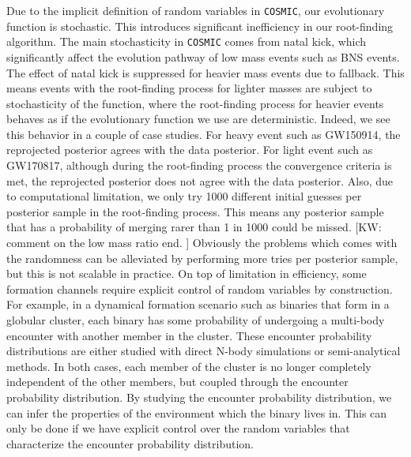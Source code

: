 \documentclass[twocolumn]{aastex631}
\newcommand{\kw}[1]{{\color{rb4}[KW: #1 ]}}
\begin{document}
Due to the implicit definition of random variables in \texttt{COSMIC}, our evolutionary function is stochastic.
This introduces significant inefficiency in our root-finding algorithm.
The main stochasticity in \texttt{COSMIC} comes from natal kick, which significantly affect the evolution pathway of low mass events such as BNS events.
The effect of natal kick is suppressed for heavier mass events due to fallback.
This means events with the root-finding process for lighter masses are subject to stochasticity of the function,
where the root-finding process for heavier events behaves as if the evolutionary function we use are deterministic.
Indeed, we see this behavior in a couple of case studies.
For heavy event such as GW150914, the reprojected posterior agrees with the data posterior.
For light event such as GW170817, although during the root-finding process the convergence criteria is met,
the reprojected posterior does not agree with the data posterior.
Also, due to computational limitation, we only try 1000 different initial guesses per posterior sample in the root-finding process.
This means any posterior sample that has a probability of merging rarer than 1 in 1000 could be missed.
\kw{comment on the low mass ratio end.}
Obviously the problems which comes with the randomness can be alleviated by performing more tries per posterior sample,
but this is not scalable in practice.
On top of limitation in efficiency, some formation channels require explicit control of random variables by construction.
For example, in a dynamical formation scenario such as binaries that form in a globular cluster,
each binary has some probability of undergoing a multi-body encounter with another member in the cluster.
These encounter probability distributions are either studied with direct N-body simulations or semi-analytical methods.
In both cases, each member of the cluster is no longer completely independent of the other members, but coupled through the encounter probability distribution.
By studying the encounter probability distribution, we can infer the properties of the environment which the binary lives in.
This can only be done if we have explicit control over the random variables that characterize the encounter probability distribution.




\end{document}
